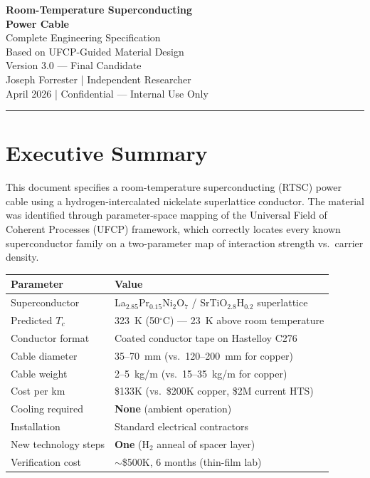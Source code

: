 \documentclass[11pt, a4paper]{article}
\begin{document}
\begin{center}
  {\LARGE \textbf{Room-Temperature Superconducting}}\\[4pt]
  {\LARGE \textbf{Power Cable}}\\[6pt]
  {\large Complete Engineering Specification}\\[4pt]
  {\large Based on UFCP-Guided Material Design}\\[10pt]
  {\color{nm-gray}\small Version 3.0 --- Final Candidate}\\[4pt]
  {\color{nm-gray}\small Joseph Forrester \quad|\quad
    Independent Researcher}\\[4pt]
  {\color{nm-gray}\small April 2026 \quad|\quad
    Confidential --- Internal Use Only}
\end{center}

\vspace{1em}
\hrule
\vspace{1em}

\section*{Executive Summary}

This document specifies a room-temperature superconducting (RTSC)
power cable using a hydrogen-intercalated nickelate superlattice
conductor. The material was identified through parameter-space
mapping of the Universal Field of Coherent Processes (UFCP)
framework, which correctly locates every known superconductor
family on a two-parameter map of interaction strength vs.\
carrier density.

\begin{center}
\begin{tabular}{@{}ll@{}}
\toprule
\textbf{Parameter} & \textbf{Value} \\
\midrule
Superconductor & La$_{2.85}$Pr$_{0.15}$Ni$_2$O$_7$ /
  SrTiO$_{2.8}$H$_{0.2}$ superlattice \\
Predicted $T_c$ & 323~K (50$^\circ$C) --- 23~K above room temperature \\
Conductor format & Coated conductor tape on Hastelloy C276 \\
Cable diameter & 35--70~mm (vs.\ 120--200~mm for copper) \\
Cable weight & 2--5~kg/m (vs.\ 15--35~kg/m for copper) \\
Cost per km & \$133K (vs.\ \$200K copper, \$2M current HTS) \\
Cooling required & \textbf{None} (ambient operation) \\
Installation & Standard electrical contractors \\
New technology steps & \textbf{One} (H$_2$ anneal of spacer layer) \\
Verification cost & $\sim$\$500K, 6 months (thin-film lab) \\
\bottomrule
\end{tabular}
\end{center}
\end{document}

